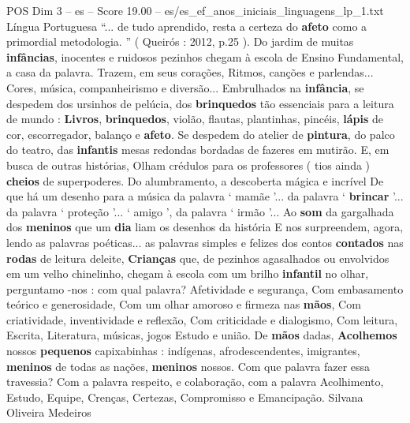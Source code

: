 \begin{textsample}{POS Dim 3 – es – Score 19.00 – es/es\_ef\_anos\_iniciais\_linguagens\_lp\_1.txt}  \label{ex:f3_pos_120}
Língua Portuguesa “... de tudo aprendido, resta a certeza do \textbf{afeto} como a primordial metodologia. ” ( Queirós : 2012, p.25 ).
Do jardim de muitas \textbf{infâncias}, inocentes e ruidosos pezinhos chegam à escola de Ensino Fundamental, a casa da palavra.
Trazem, em seus corações, Ritmos, canções e parlendas...
Cores, música, companheirismo e diversão...
Embrulhados na \textbf{infância}, se despedem dos ursinhos de pelúcia, dos \textbf{brinquedos} tão essenciais para a leitura de mundo : \textbf{Livros}, \textbf{brinquedos}, violão, flautas, plantinhas, pincéis, \textbf{lápis} de cor, escorregador, balanço e \textbf{afeto}.
Se despedem do atelier de \textbf{pintura}, do palco do teatro, das \textbf{infantis} mesas redondas bordadas de fazeres em mutirão.
E, em busca de outras histórias, Olham crédulos para os professores ( tios ainda ) \textbf{cheios} de superpoderes.
Do alumbramento, a descoberta mágica e incrível De que há um desenho para a música da palavra ‘ mamãe ’... da palavra ‘ \textbf{brincar} ’... da palavra ‘ proteção ’... ‘ amigo ’, da palavra ‘ irmão ’...
Ao \textbf{som} da gargalhada dos \textbf{meninos} que um \textbf{dia} liam os desenhos da história E nos surpreendem, agora, lendo as palavras poéticas... as palavras simples e felizes dos contos \textbf{contados} nas \textbf{rodas} de leitura deleite, \textbf{Crianças} que, de pezinhos agasalhados ou envolvidos em um velho chinelinho, chegam à escola com um brilho \textbf{infantil} no olhar, perguntamo -nos : com qual palavra?
Afetividade e segurança, Com embasamento teórico e generosidade, Com um olhar amoroso e firmeza nas \textbf{mãos}, Com criatividade, inventividade e reflexão, Com criticidade e dialogismo, Com leitura, Escrita, Literatura, músicas, jogos Estudo e união.
De \textbf{mãos} dadas, \textbf{Acolhemos} nossos \textbf{pequenos} capixabinhas : indígenas, afrodescendentes, imigrantes, \textbf{meninos} de todas as nações, \textbf{meninos} nossos.
Com que palavra fazer essa travessia?
Com a palavra respeito, e colaboração, com a palavra Acolhimento, Estudo, Equipe, Crenças, Certezas, Compromisso e Emancipação.
Silvana Oliveira Medeiros

\end{textsample}
